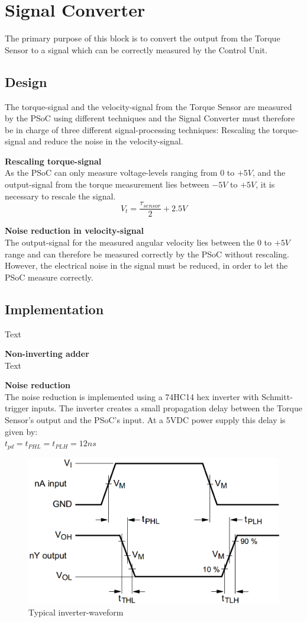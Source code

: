 \section{Signal Converter}
The primary purpose of this block is to convert the output from the Torque Sensor to a signal which can be correctly measured by the Control Unit.

\subsection{Design}
The torque-signal and the velocity-signal from the Torque Sensor are measured by the PSoC using different techniques and the Signal Converter must therefore be in charge of three different signal-processing techniques: Rescaling the torque-signal and reduce the noise in the velocity-signal.

\textbf{Rescaling torque-signal}\\
As the PSoC can only measure voltage-levels ranging from $0$ to $+5 V$, and the output-signal from the torque measurement lies between $-5 V$ to $+5 V$, it is necessary to rescale the signal.
\begin{equation}
	V_t = \frac{\tau_{sensor} }{2} + 2.5 V
\end{equation}

\textbf{Noise reduction in velocity-signal}\\
The output-signal for the measured angular velocity lies between the $0$ to $+5 V$ range and can therefore be measured correctly by the PSoC without rescaling. However, the electrical noise in the signal must be reduced, in order to let the PSoC measure correctly.

\subsection{Implementation}
Text

\textbf{Non-inverting adder}\\
Text

\textbf{Noise reduction}\\
The noise reduction is implemented using a 74HC14 hex inverter with Schmitt-trigger inputs. The inverter creates a small propagation delay between the Torque Sensor's output and the PSoC's input. At a 5VDC power supply this delay is given by:\\
$t_{pd} = t_{PHL} = t_{PLH} = 12 ns$


\begin{figure}[H]
	\centering
	\includegraphics[width=0.5\linewidth]{Hardware/Pictures/74HC14_waveform}
	\caption{Typical inverter-waveform}
	\label{fig:SchmittTrigger_waveform}
\end{figure}

